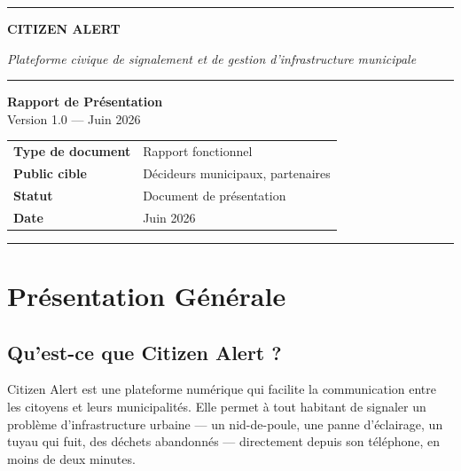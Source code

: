 \documentclass[12pt, a4paper]{article}
\begin{document}
\begin{titlepage}
  \centering
  \vspace*{2cm}

  {\color{primary}\rule{\textwidth}{2pt}}
  \vspace{0.8cm}

  {\fontsize{36}{40}\selectfont\bfseries\color{dark} CITIZEN ALERT}

  \vspace{0.4cm}
  {\large\color{muted}\itshape Plateforme civique de signalement et de gestion d'infrastructure municipale}

  \vspace{0.8cm}
  {\color{amber}\rule{\textwidth}{1pt}}

  \vspace{2cm}

  {\large\bfseries Rapport de Présentation}\\[0.4cm]
  {\color{muted} Version 1.0 — Juin 2026}

  \vfill

  \begin{tabular}{ll}
    \textbf{Type de document} & Rapport fonctionnel \\
    \textbf{Public cible}     & Décideurs municipaux, partenaires \\
    \textbf{Statut}           & Document de présentation \\
    \textbf{Date}             & Juin 2026 \\
  \end{tabular}

  \vspace{1.5cm}
  {\color{primary}\rule{\textwidth}{2pt}}
\end{titlepage}

\tableofcontents
\newpage

\section{Présentation Générale}

\subsection{Qu'est-ce que Citizen Alert ?}

Citizen Alert est une plateforme numérique qui facilite la communication entre les citoyens et leurs municipalités. Elle permet à tout habitant de signaler un problème d'infrastructure urbaine — un nid-de-poule, une panne d'éclairage, un tuyau qui fuit, des déchets abandonnés — directement depuis son téléphone, en moins de deux minutes.
\end{document}
